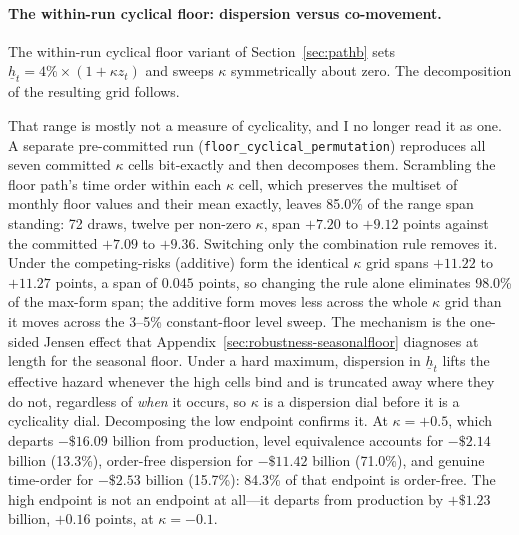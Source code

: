 \documentclass[12pt]{article}
\begin{document}
\paragraph{The within-run cyclical floor: dispersion versus co-movement.}
The within-run cyclical floor variant of Section~\ref{sec:pathb} sets $\underline{h}_t = 4\% \times (1 + \kappa z_t)$ and sweeps $\kappa$ symmetrically about zero. The decomposition of the resulting grid follows.

That range is mostly not a measure of cyclicality, and I no longer read it as one. A separate pre-committed run (\texttt{floor\_cyclical\_permutation}) reproduces all seven committed $\kappa$ cells bit-exactly and then decomposes them. Scrambling the floor path's time order within each $\kappa$ cell, which preserves the multiset of monthly floor values and their mean exactly, leaves 85.0\% of the range span standing: 72 draws, twelve per non-zero $\kappa$, span $+7.20$ to $+9.12$ points against the committed $+7.09$ to $+9.36$. Switching only the combination rule removes it. Under the competing-risks (additive) form the identical $\kappa$ grid spans $+11.22$ to $+11.27$ points, a span of $0.045$ points, so changing the rule alone eliminates 98.0\% of the max-form span; the additive form moves less across the whole $\kappa$ grid than it moves across the 3--5\% constant-floor level sweep. The mechanism is the one-sided Jensen effect that Appendix~\ref{sec:robustness-seasonalfloor} diagnoses at length for the seasonal floor. Under a hard maximum, dispersion in $\underline{h}_t$ lifts the effective hazard whenever the high cells bind and is truncated away where they do not, regardless of \emph{when} it occurs, so $\kappa$ is a dispersion dial before it is a cyclicality dial. Decomposing the low endpoint confirms it. At $\kappa = +0.5$, which departs $-\$16.09$ billion from production, level equivalence accounts for $-\$2.14$ billion (13.3\%), order-free dispersion for $-\$11.42$ billion (71.0\%), and genuine time-order for $-\$2.53$ billion (15.7\%): 84.3\% of that endpoint is order-free. The high endpoint is not an endpoint at all---it departs from production by $+\$1.23$ billion, $+0.16$ points, at $\kappa = -0.1$.
\end{document}
